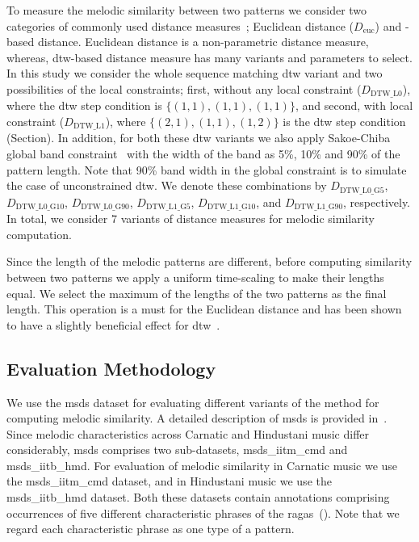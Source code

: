 To measure the melodic similarity between two patterns we consider two categories of commonly used distance measures~\cite{Ross2012b, Rao2014, muller2007information}; Euclidean distance ($D_{\mathrm{euc}}$) and -based distance. Euclidean distance is a non-parametric distance measure, whereas, \gls{dtw}-based distance measure has many variants and parameters to select. In this study we consider the whole sequence matching \gls{dtw} variant and two possibilities of the local constraints; first, without any local constraint ($D_{\mathrm{DTW\_L0}}$), where the \gls{dtw} step condition is $\lbrace(1,1), (1,1), (1,1)\rbrace$, and second, with local constraint ($D_{\mathrm{DTW\_L1}}$), where $\lbrace(2,1), (1,1), (1,2)\rbrace$ is the \gls{dtw} step condition (Section). In addition, for both these \gls{dtw} variants we also apply Sakoe-Chiba global band constraint~\cite{Sakoe78TASLP} with the width of the band as 5\%, 10\% and 90\% of the pattern length. Note that 90\% band width in the global constraint is to simulate the case of unconstrained \gls{dtw}. We denote these combinations by $D_{\mathrm{DTW\_L0\_G5}}$, $D_{\mathrm{DTW\_L0\_G10}}$, $D_{\mathrm{DTW\_L0\_G90}}$, $D_{\mathrm{DTW\_L1\_G5}}$, $D_{\mathrm{DTW\_L1\_G10}}$, and $D_{\mathrm{DTW\_L1\_G90}}$, respectively. In total, we consider 7 variants of distance measures for melodic similarity computation.

Since the length of the melodic patterns are different, before computing similarity between two patterns we apply  a uniform time-scaling to make their lengths equal. We select the maximum of the lengths of the two patterns as the final length. This operation is a must for the Euclidean distance and has been shown to have a slightly beneficial effect for \gls{dtw}~\citep{Ratanamahatana2004}.


\subsection{Evaluation Methodology}
\label{sec:patterns_melodic_similarity_evaluation_methodology}

We use the \acrshort{msds} dataset for evaluating different variants of the method for computing melodic similarity. A detailed description of \acrshort{msds} is provided in~. Since melodic characteristics across Carnatic and Hindustani music differ considerably, \acrshort{msds} comprises two sub-datasets, \acrshort{msds_iitm_cmd} and \acrshort{msds_iitb_hmd}. For evaluation of melodic similarity in Carnatic music we use the \acrshort{msds_iitm_cmd} dataset, and in Hindustani music we use the \acrshort{msds_iitb_hmd} dataset. Both these datasets contain annotations comprising occurrences of five different characteristic phrases of the \glspl{raga}~(). Note that we regard each characteristic phrase as one type of a pattern.

